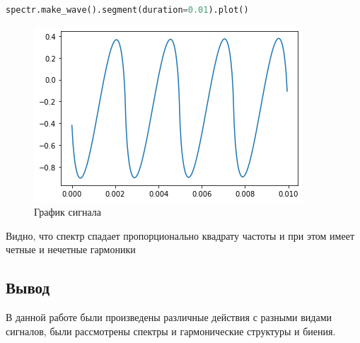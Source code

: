 \begin{lstlisting}[language=Python]
spectr.make_wave().segment(duration=0.01).plot()
\end{lstlisting}

\begin{figure}[H]
	\begin{center}
		\includegraphics[scale=1]{fig/lab02/lab02_12.png}
		\caption{График сигнала}
	\end{center}
\end{figure}

Видно, что спектр спадает пропорционально квадрату частоты и при этом имеет четные и нечетные гармоники

\subsection{Вывод}

В данной работе были произведены различные действия с разными видами сигналов, были рассмотрены спектры и гармонические структуры и биения.